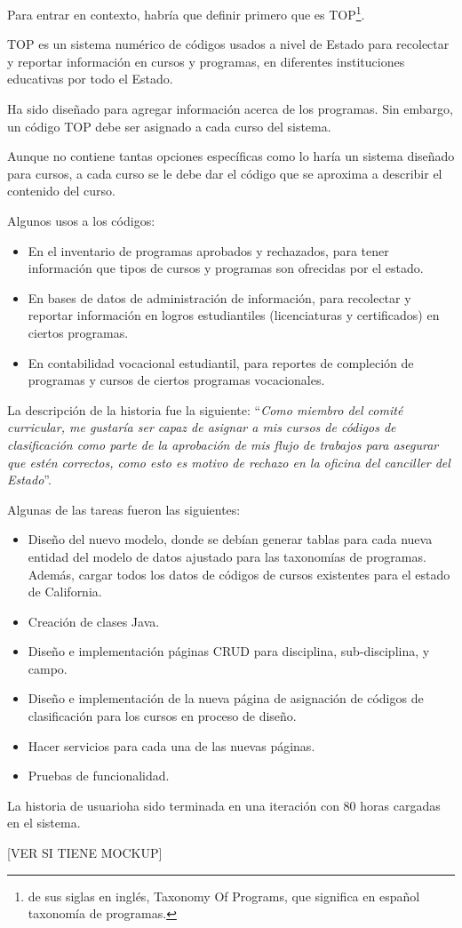 Para entrar en contexto, habría que definir primero que es TOP\footnote{de sus siglas en inglés, Taxonomy Of Programs, que significa en español taxonomía de programas.}.

TOP es un sistema numérico de códigos usados a nivel de Estado para recolectar y reportar información en cursos y programas, en diferentes instituciones educativas \citep{brice_w_harris_program_2013} por todo el Estado. 

Ha sido diseñado para agregar información acerca de los programas. Sin embargo, un código TOP debe ser asignado a cada curso del sistema. 

Aunque no contiene tantas opciones específicas como lo haría un sistema diseñado para cursos, a cada curso se le debe dar el código que se aproxima a describir el contenido del curso.

Algunos usos a los códigos:
\begin{itemize}
	\item En el inventario de programas aprobados y rechazados, para tener información que tipos de cursos y programas son ofrecidas por el estado.
	\item En bases de datos de administración de información, para recolectar y reportar información en logros estudiantiles (licenciaturas y certificados) en ciertos programas.
	\item En contabilidad vocacional estudiantil, para reportes de compleción de programas y cursos de ciertos programas vocacionales.
\end{itemize}

La descripción de la historia fue la siguiente: \enquote{\textit{Como miembro del comité curricular, me gustaría ser capaz de asignar a mis cursos de códigos de clasificación como parte de la aprobación de mis flujo de trabajos para asegurar que estén correctos, como esto es motivo de rechazo en la oficina del canciller del Estado}}.

Algunas de las tareas fueron las siguientes:
\begin{itemize}
	\item Diseño del nuevo modelo, donde se debían generar tablas para cada nueva entidad del modelo de datos ajustado para las taxonomías de programas. Además, cargar todos los datos de códigos de cursos existentes para el estado de California.
	\item Creación de clases Java.
	\item Diseño e implementación páginas CRUD para disciplina, sub-disciplina, y campo.
	\item Diseño e implementación de la nueva página de asignación de códigos de clasificación para los cursos en proceso de diseño.
	\item Hacer servicios para cada una de las nuevas páginas.
	\item Pruebas de funcionalidad.
\end{itemize}

La historia de usuarioha sido terminada en una iteración con 80 horas cargadas en el sistema.


[VER SI TIENE MOCKUP]